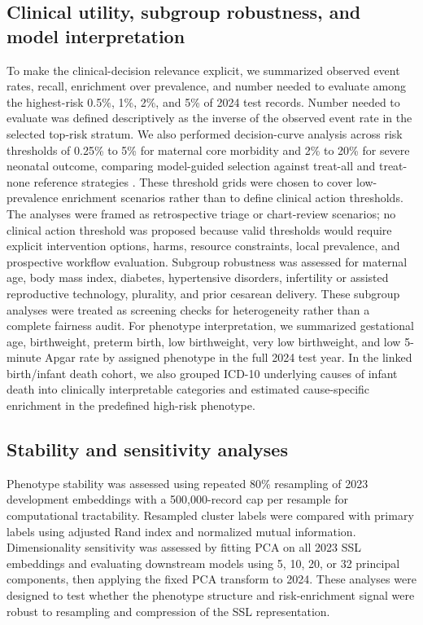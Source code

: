 \documentclass[pdflatex,sn-vancouver-num]{sn-jnl}
\begin{document}
\subsection{Clinical utility, subgroup robustness, and model interpretation}\label{subsec:utility-interpretability}

To make the clinical-decision relevance explicit, we summarized observed event rates, recall, enrichment over prevalence, and number needed to evaluate among the highest-risk 0.5\%, 1\%, 2\%, and 5\% of 2024 test records. Number needed to evaluate was defined descriptively as the inverse of the observed event rate in the selected top-risk stratum. We also performed decision-curve analysis across risk thresholds of 0.25\% to 5\% for maternal core morbidity and 2\% to 20\% for severe neonatal outcome, comparing model-guided selection against treat-all and treat-none reference strategies \cite{vickers2006decision}. These threshold grids were chosen to cover low-prevalence enrichment scenarios rather than to define clinical action thresholds. The analyses were framed as retrospective triage or chart-review scenarios; no clinical action threshold was proposed because valid thresholds would require explicit intervention options, harms, resource constraints, local prevalence, and prospective workflow evaluation. Subgroup robustness was assessed for maternal age, body mass index, diabetes, hypertensive disorders, infertility or assisted reproductive technology, plurality, and prior cesarean delivery. These subgroup analyses were treated as screening checks for heterogeneity rather than a complete fairness audit. For phenotype interpretation, we summarized gestational age, birthweight, preterm birth, low birthweight, very low birthweight, and low 5-minute Apgar rate by assigned phenotype in the full 2024 test year. In the linked birth/infant death cohort, we also grouped ICD-10 underlying causes of infant death into clinically interpretable categories and estimated cause-specific enrichment in the predefined high-risk phenotype.

\subsection{Stability and sensitivity analyses}\label{subsec:stability}

Phenotype stability was assessed using repeated 80\% resampling of 2023 development embeddings with a 500,000-record cap per resample for computational tractability. Resampled cluster labels were compared with primary labels using adjusted Rand index and normalized mutual information. Dimensionality sensitivity was assessed by fitting PCA on all 2023 SSL embeddings and evaluating downstream models using 5, 10, 20, or 32 principal components, then applying the fixed PCA transform to 2024. These analyses were designed to test whether the phenotype structure and risk-enrichment signal were robust to resampling and compression of the SSL representation.
\end{document}
